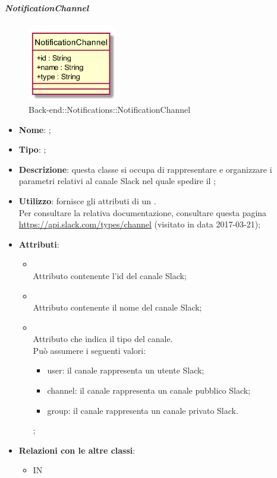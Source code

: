 \hypertarget{NotificationChannel_label}{\subparagraph{NotificationChannel}}
\begin{figure}[h]
	\centering
	\includegraphics[width=0.35\textwidth,height=\textheight,keepaspectratio]{images/ClassNotificationChannel.png}
	\caption{Back-end::Notifications::NotificationChannel}
\end{figure}
\begin{itemize}
	\item \textbf{Nome}: ;
	\item \textbf{Tipo}: ;
	\item \textbf{Descrizione}: questa classe si occupa di rappresentare e organizzare i parametri relativi al canale Slack nel quale spedire il ;
	\item \textbf{Utilizzo}: fornisce gli attributi di un . \\
	Per consultare la relativa documentazione, consultare questa pagina \url{https://api.slack.com/types/channel} (visitato in data 2017-03-21);
	\item \textbf{Attributi}:
	\begin{itemize}
		\item[]  \\
		Attributo contenente l'id del canale Slack;
		\item[]  \\
		Attributo contenente il nome del canale Slack;
		\item[]  \\
		Attributo che indica il tipo del canale. \\ Può assumere i seguenti valori:
		\begin{itemize}
			\item user: il canale rappresenta un utente Slack;
			\item channel: il canale rappresenta un canale pubblico Slack;
			\item group: il canale rappresenta un canale privato Slack.
		\end{itemize};
	\end{itemize}
	\item \textbf{Relazioni con le altre classi}:
	\begin{itemize}
		\item IN \hyperlink{NotificationService_label}{}
	\end{itemize}
\end{itemize}
\FloatBarrier

